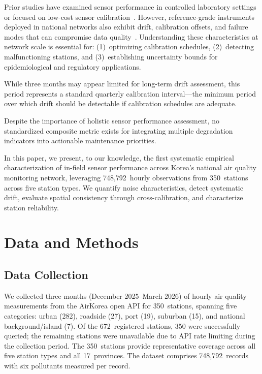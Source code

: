 \documentclass[12pt]{article}
\begin{document}
Prior studies have examined sensor performance in controlled laboratory settings~\cite{malings2020fine} or focused on low-cost sensor calibration~\cite{zimmerman2018machine, barkjohn2021development}. However, reference-grade instruments deployed in national networks also exhibit drift, calibration offsets, and failure modes that can compromise data quality~\cite{munir2019analysing}. Understanding these characteristics at network scale is essential for: (1)~optimizing calibration schedules, (2)~detecting malfunctioning stations, and (3)~establishing uncertainty bounds for epidemiological and regulatory applications.

While three months may appear limited for long-term drift assessment, this period represents a standard quarterly calibration interval---the minimum period over which drift should be detectable if calibration schedules are adequate.

Despite the importance of holistic sensor performance assessment, no standardized composite metric exists for integrating multiple degradation indicators into actionable maintenance priorities.

In this paper, we present, to our knowledge, the first systematic empirical characterization of in-field sensor performance across Korea's national air quality monitoring network, leveraging 748{,}792~hourly observations from 350~stations across five station types. We quantify noise characteristics, detect systematic drift, evaluate spatial consistency through cross-calibration, and characterize station reliability.

\section{Data and Methods}

\subsection{Data Collection}

We collected three months (December 2025--March 2026) of hourly air quality measurements from the AirKorea open API for 350~stations, spanning five categories: urban (282), roadside (27), port (19), suburban (15), and national background/island (7). Of the 672~registered stations, 350 were successfully queried; the remaining stations were unavailable due to API rate limiting during the collection period. The 350~stations provide representative coverage across all five station types and all 17~provinces. The dataset comprises 748{,}792~records with six pollutants measured per record.
\end{document}
